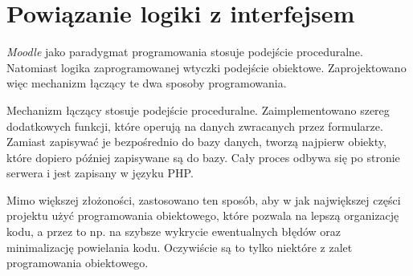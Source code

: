 \section{Powiązanie logiki z interfejsem}
\label{Chapter67}

\textit{Moodle} jako paradygmat programowania stosuje podejście proceduralne. Natomiast logika zaprogramowanej wtyczki podejście obiektowe. Zaprojektowano więc mechanizm łączący te dwa sposoby programowania.

Mechanizm łączący stosuje podejście proceduralne. Zaimplementowano szereg dodatkowych funkcji, które operują na danych zwracanych przez formularze. Zamiast zapisywać je bezpośrednio do bazy danych, tworzą najpierw obiekty, które dopiero później zapisywane są do bazy. Cały proces odbywa się po stronie serwera i jest zapisany w języku PHP. 

Mimo większej złożoności, zastosowano ten sposób, aby w jak największej części projektu użyć programowania obiektowego, które pozwala na lepszą organizację kodu, a przez to np. na szybsze wykrycie ewentualnych błędów oraz minimalizację powielania kodu. Oczywiście są to tylko niektóre z zalet programowania obiektowego.